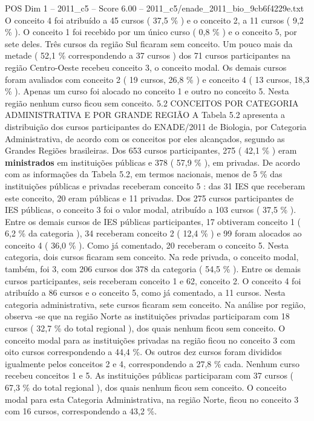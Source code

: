 \begin{textsample}{POS Dim 1 – 2011\_c5 – Score 6.00 – 2011\_c5/enade\_2011\_bio\_9cb6f4229e.txt}
O conceito 4 foi atribuído a 45 cursos ( 37,5 \% ) e o conceito 2, a 11 cursos ( 9,2 \% ).
O conceito 1 foi recebido por um único curso ( 0,8 \% ) e o conceito 5, por sete deles.
Três cursos da região Sul ficaram sem conceito.
Um pouco mais da metade ( 52,1 \% correspondendo a 37 cursos ) dos 71 cursos participantes na região Centro-Oeste recebeu conceito 3, o conceito modal.
Os demais cursos foram avaliados com conceito 2 ( 19 cursos, 26,8 \% ) e conceito 4 ( 13 cursos, 18,3 \% ).
Apenas um curso foi alocado no conceito 1 e outro no conceito 5.
Nesta região nenhum curso ficou sem conceito. 5.2 CONCEITOS POR CATEGORIA ADMINISTRATIVA E POR GRANDE REGIÃO A Tabela 5.2 apresenta a distribuição dos cursos participantes do ENADE/2011 de Biologia, por Categoria Administrativa, de acordo com os conceitos por eles alcançados, segundo as Grandes Regiões brasileiras.
Dos 653 cursos participantes, 275 ( 42,1 \% ) eram \textbf{ministrados} em instituições públicas e 378 ( 57,9 \% ), em privadas.
De acordo com as informações da Tabela 5.2, em termos nacionais, menos de 5 \% das instituições públicas e privadas receberam conceito 5 : das 31 IES que receberam este conceito, 20 eram públicas e 11 privadas.
Dos 275 cursos participantes de IES públicas, o conceito 3 foi o valor modal, atribuído a 103 cursos ( 37,5 \% ).
Entre os demais cursos de IES públicas participantes, 17 obtiveram conceito 1 ( 6,2 \% da categoria ), 34 receberam conceito 2 ( 12,4 \% ) e 99 foram alocados ao conceito 4 ( 36,0 \% ).
Como já comentado, 20 receberam o conceito 5.
Nesta categoria, dois cursos ficaram sem conceito.
Na rede privada, o conceito modal, também, foi 3, com 206 cursos dos 378 da categoria ( 54,5 \% ).
Entre os demais cursos participantes, seis receberam conceito 1 e 62, conceito 2.
O conceito 4 foi atribuído a 86 cursos e o conceito 5, como já comentado, a 11 cursos.
Nesta categoria administrativa, sete cursos ficaram sem conceito.
Na análise por região, observa -se que na região Norte as instituições privadas participaram com 18 cursos ( 32,7 \% do total regional ), dos quais nenhum ficou sem conceito.
O conceito modal para as instituições privadas na região ficou no conceito 3 com oito cursos correspondendo a 44,4 \%.
Os outros dez cursos foram divididos igualmente pelos conceitos 2 e 4, correspondendo a 27,8 \% cada.
Nenhum curso recebeu conceitos 1 e 5.
As instituições públicas participaram com 37 cursos ( 67,3 \% do total regional ), dos quais nenhum ficou sem conceito.
O conceito modal para esta Categoria Administrativa, na região Norte, ficou no conceito 3 com 16 cursos, correspondendo a 43,2 \%.

\end{textsample}
